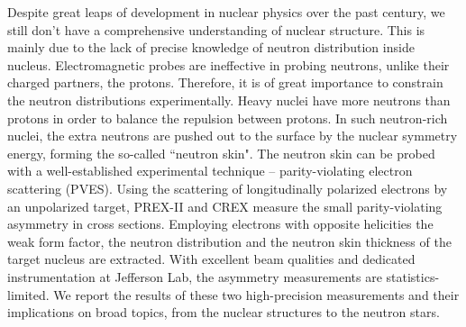 Despite great leaps of development in nuclear physics over the past century, 
we still don’t have a comprehensive understanding of nuclear structure. This 
is mainly due to the lack of precise knowledge of neutron distribution inside nucleus. 
Electromagnetic probes are ineffective in probing neutrons, unlike their charged partners, 
the protons. Therefore, it is of great importance to constrain the neutron distributions experimentally. 
Heavy nuclei have more neutrons than protons in order to balance the repulsion between protons. 
In such neutron-rich nuclei, the extra neutrons are pushed out to the surface 
by the nuclear symmetry energy, forming the so-called ``neutron skin". 
The neutron skin can be probed with a well-established experimental technique 
-- parity-violating electron scattering (PVES). Using the scattering of 
longitudinally polarized electrons by an unpolarized target, PREX-II and CREX 
measure the small parity-violating asymmetry in cross sections. Employing 
electrons with opposite helicities the weak form factor, the neutron distribution 
and the neutron skin thickness of the target nucleus are extracted. 
With excellent beam qualities and dedicated instrumentation at Jefferson Lab, 
the asymmetry measurements are statistics-limited. We report the results of these 
two high-precision measurements and their implications on broad topics, 
from the nuclear structures to the neutron stars.
